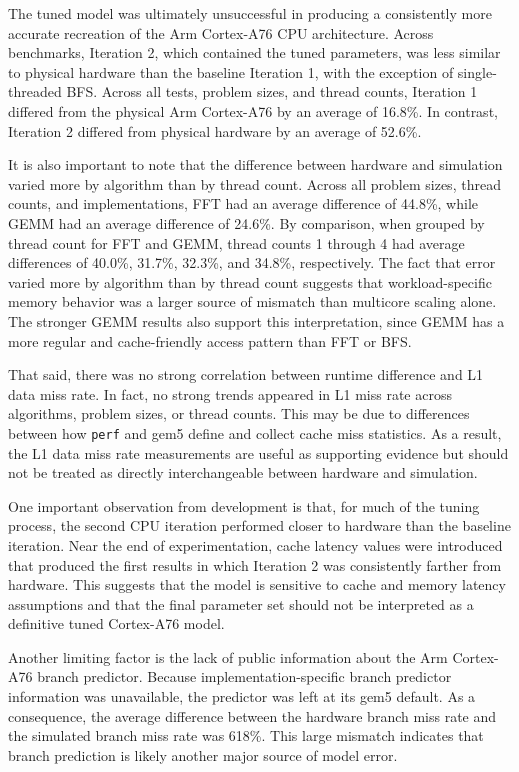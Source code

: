 \documentclass[acmlarge]{acmart}
\begin{document}
The tuned model was ultimately unsuccessful in producing a consistently more
accurate recreation of the Arm Cortex-A76 CPU architecture. Across benchmarks,
Iteration 2, which contained the tuned parameters, was less similar to physical
hardware than the baseline Iteration 1, with the exception of single-threaded
BFS. Across all tests, problem sizes, and thread counts, Iteration 1 differed
from the physical Arm Cortex-A76 by an average of 16.8\%. In contrast, Iteration
2 differed from physical hardware by an average of 52.6\%.

It is also important to note that the difference between hardware and simulation
varied more by algorithm than by thread count. Across all problem sizes, thread
counts, and implementations, FFT had an average difference of 44.8\%, while GEMM
had an average difference of 24.6\%. By comparison, when grouped by thread count
for FFT and GEMM, thread counts 1 through 4 had average differences of 40.0\%,
31.7\%, 32.3\%, and 34.8\%, respectively. The fact that error varied more by
algorithm than by thread count suggests that workload-specific memory behavior
was a larger source of mismatch than multicore scaling alone. The stronger GEMM
results also support this interpretation, since GEMM has a more regular and
cache-friendly access pattern than FFT or BFS.

That said, there was no strong correlation between runtime difference and L1 data
miss rate. In fact, no strong trends appeared in L1 miss rate across algorithms,
problem sizes, or thread counts. This may be due to differences between how
\texttt{perf} and gem5 define and collect cache miss statistics. As a result, the
L1 data miss rate measurements are useful as supporting evidence but should not
be treated as directly interchangeable between hardware and simulation.

One important observation from development is that, for much of the tuning
process, the second CPU iteration performed closer to hardware than the baseline
iteration. Near the end of experimentation, cache latency values were introduced
that produced the first results in which Iteration 2 was consistently farther
from hardware. This suggests that the model is sensitive to cache and memory
latency assumptions and that the final parameter set should not be interpreted as
a definitive tuned Cortex-A76 model.

Another limiting factor is the lack of public information about the Arm
Cortex-A76 branch predictor. Because implementation-specific branch predictor
information was unavailable, the predictor was left at its gem5 default. As a
consequence, the average difference between the hardware branch miss rate and the
simulated branch miss rate was 618\%. This large mismatch indicates that branch
prediction is likely another major source of model error.
\end{document}

